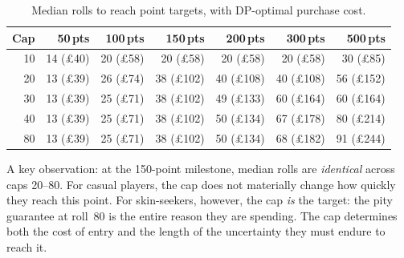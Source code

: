 \documentclass[11pt, a4paper]{article}
\begin{document}
\begin{table}[H]
\centering
\caption{Median rolls to reach point targets, with DP-optimal purchase cost.}
\label{tab:rolls-to-target}
\begin{tabular}{r r r r r r r}
\toprule
Cap & 50\,pts & 100\,pts & 150\,pts & 200\,pts & 300\,pts & 500\,pts \\
\midrule
10 & 14 (\pounds40)  & 20 (\pounds58)  & 20 (\pounds58)   & 20 (\pounds58)   & 20 (\pounds58)   & 30 (\pounds85)  \\
20 & 13 (\pounds39)  & 26 (\pounds74)  & 38 (\pounds102)  & 40 (\pounds108)  & 40 (\pounds108)  & 56 (\pounds152) \\
30 & 13 (\pounds39)  & 25 (\pounds71)  & 38 (\pounds102)  & 49 (\pounds133)  & 60 (\pounds164)  & 60 (\pounds164) \\
40 & 13 (\pounds39)  & 25 (\pounds71)  & 38 (\pounds102)  & 50 (\pounds134)  & 67 (\pounds178)  & 80 (\pounds214) \\
80 & 13 (\pounds39)  & 25 (\pounds71)  & 38 (\pounds102)  & 50 (\pounds134)  & 68 (\pounds182)  & 91 (\pounds244) \\
\bottomrule
\end{tabular}
\end{table}

\noindent A key observation: at the 150-point milestone, median rolls
are \emph{identical} across caps 20--80. For casual players, the cap
does not materially change how quickly they reach this point. For
skin-seekers, however, the cap \emph{is} the target: the pity
guarantee at roll~80 is the entire reason they are spending. The
cap determines both the cost of entry and the length of the
uncertainty they must endure to reach it.


\end{document}
